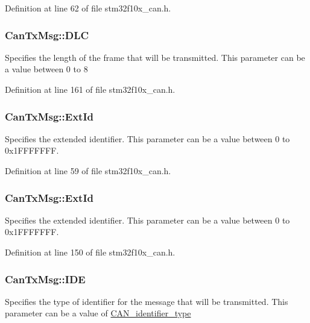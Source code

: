 Definition at line 62 of file stm32f10x\+\_\+can.\+h.

\subsubsection[{\texorpdfstring{D\+LC}{DLC}}]{ Can\+Tx\+Msg\+::\+D\+LC}\hypertarget{struct_can_tx_msg_ab49d0fa602aad2fd9cd007adafc11fc2}{}\label{struct_can_tx_msg_ab49d0fa602aad2fd9cd007adafc11fc2}
Specifies the length of the frame that will be transmitted. This parameter can be a value between 0 to 8 

Definition at line 161 of file stm32f10x\+\_\+can.\+h.

\subsubsection[{\texorpdfstring{Ext\+Id}{ExtId}}]{ Can\+Tx\+Msg\+::\+Ext\+Id}\hypertarget{struct_can_tx_msg_a21eb90876a125cc6f5db3ae0cdb4138e}{}\label{struct_can_tx_msg_a21eb90876a125cc6f5db3ae0cdb4138e}
Specifies the extended identifier. This parameter can be a value between 0 to 0x1\+F\+F\+F\+F\+F\+FF. 

Definition at line 59 of file stm32f10x\+\_\+can.\+h.

\subsubsection[{\texorpdfstring{Ext\+Id}{ExtId}}]{ Can\+Tx\+Msg\+::\+Ext\+Id}\hypertarget{struct_can_tx_msg_a33050a95a4cc463b589ff16bdd416f22}{}\label{struct_can_tx_msg_a33050a95a4cc463b589ff16bdd416f22}
Specifies the extended identifier. This parameter can be a value between 0 to 0x1\+F\+F\+F\+F\+F\+FF. 

Definition at line 150 of file stm32f10x\+\_\+can.\+h.

\subsubsection[{\texorpdfstring{I\+DE}{IDE}}]{ Can\+Tx\+Msg\+::\+I\+DE}\hypertarget{struct_can_tx_msg_ae25ec4c40275e74e716712877f3af3e1}{}\label{struct_can_tx_msg_ae25ec4c40275e74e716712877f3af3e1}
Specifies the type of identifier for the message that will be transmitted. This parameter can be a value of \hyperlink{group___c_a_n__identifier__type}{C\+A\+N\+\_\+identifier\+\_\+type} 

